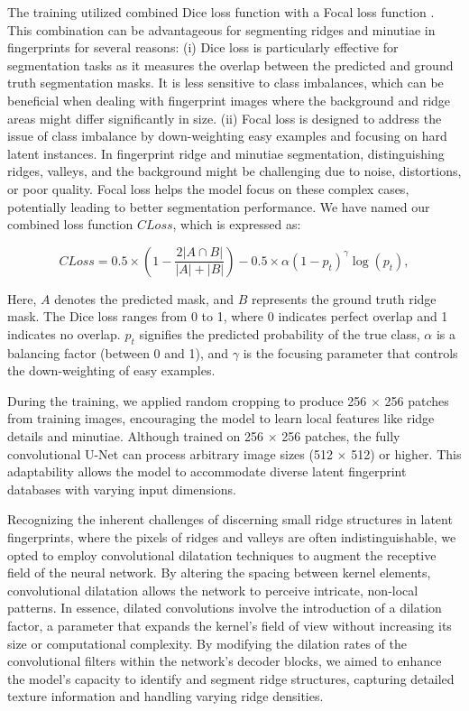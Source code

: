 \documentclass[twocolumn, switch]{article} %
\begin{document}
The training utilized combined Dice loss function \cite{sudre2017generalised} with a Focal loss function \cite{DBLP:journals/corr/abs-1708-02002}. This combination can be advantageous for segmenting ridges and minutiae in fingerprints for several reasons: (i) Dice loss is particularly effective for segmentation tasks as it measures the overlap between the predicted and ground truth segmentation masks. It is less sensitive to class imbalances, which can be beneficial when dealing with fingerprint images where the background and ridge areas might differ significantly in size. (ii) Focal loss is designed to address the issue of class imbalance by down-weighting easy examples and focusing on hard latent instances. In fingerprint ridge and minutiae segmentation, distinguishing ridges, valleys, and the background might be challenging due to noise, distortions, or poor quality. Focal loss helps the model focus on these complex cases, potentially leading to better segmentation performance. We have named our combined loss function $CLoss$, which is expressed as:

{\small
\begin{equation}
CLoss = 0.5 \times (1 - \frac{2 |A \cap B|}{|A| + |B|}) - 0.5 \times \alpha (1 - p_t)^{\gamma} \log(p_t),
\end{equation}
}

Here, $A$ denotes the predicted mask, and $B$ represents the ground truth ridge mask. The Dice loss ranges from 0 to 1, where 0 indicates perfect overlap and 1 indicates no overlap. $p_t$ signifies the predicted probability of the true class, $\alpha$ is a balancing factor (between 0 and 1), and $\gamma$ is the focusing parameter that controls the down-weighting of easy examples. 

During the training, we applied random cropping to produce 256 $\times$ 256 patches from training images, encouraging the model to learn local features like ridge details and minutiae. Although trained on 256 $\times$ 256 patches, the fully convolutional U-Net can process arbitrary image sizes (512 $\times$ 512) or higher. This adaptability allows the model to accommodate diverse latent fingerprint databases with varying input dimensions.

Recognizing the inherent challenges of discerning small ridge structures in latent fingerprints, where the pixels of ridges and valleys are often indistinguishable, we opted to employ convolutional dilatation techniques \cite{yu2016multiscale} to augment the receptive field of the neural network. By altering the spacing between kernel elements, convolutional dilatation allows the network to perceive intricate, non-local patterns. In essence, dilated convolutions involve the introduction of a dilation factor, a parameter that expands the kernel's field of view without increasing its size or computational complexity. By modifying the dilation rates of the convolutional filters within the network's decoder blocks, we aimed to enhance the model's capacity to identify and segment ridge structures, capturing detailed texture information and handling varying ridge densities.
\end{document}
